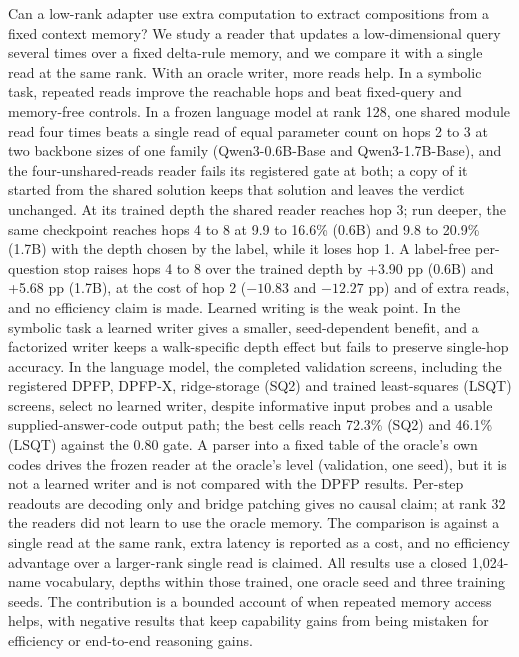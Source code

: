 Can a low-rank adapter use extra computation to extract compositions from a fixed context memory?
We study a reader that updates a low-dimensional query several times over a fixed delta-rule memory, and we compare it with a single read at the same rank.
With an oracle writer, more reads help.
In a symbolic task, repeated reads improve the reachable hops and beat fixed-query and memory-free controls.  %
In a frozen language model at rank 128, one shared module read four times beats a single read of equal parameter count on hops 2 to 3 at two backbone sizes of one family (Qwen3-0.6B-Base and Qwen3-1.7B-Base), and the four-unshared-reads reader fails its registered gate at both; a copy of it started from the shared solution keeps that solution and leaves the verdict unchanged.  %
At its trained depth the shared reader reaches hop 3; run deeper, the same checkpoint reaches hops 4 to 8 at 9.9 to 16.6\% (0.6B) and 9.8 to 20.9\% (1.7B) with the depth chosen by the label, while it loses hop 1.  %
A label-free per-question stop raises hops 4 to 8 over the trained depth by +3.90 pp (0.6B) and +5.68 pp (1.7B), at the cost of hop 2 ($-10.83$ and $-12.27$ pp) and of extra reads, and no efficiency claim is made.  %
Learned writing is the weak point.
In the symbolic task a learned writer gives a smaller, seed-dependent benefit, and a factorized writer keeps a walk-specific depth effect but fails to preserve single-hop accuracy.  %
In the language model, the completed validation screens, including the registered DPFP, DPFP-X, ridge-storage (SQ2) and trained least-squares (LSQT) screens, select no learned writer, despite informative input probes and a usable supplied-answer-code output path; the best cells reach 72.3\% (SQ2) and 46.1\% (LSQT) against the 0.80 gate.  %
A parser into a fixed table of the oracle's own codes drives the frozen reader at the oracle's level (validation, one seed), but it is not a learned writer and is not compared with the DPFP results.  %
Per-step readouts are decoding only and bridge patching gives no causal claim; at rank 32 the readers did not learn to use the oracle memory.  %
The comparison is against a single read at the same rank, extra latency is reported as a cost, and no efficiency advantage over a larger-rank single read is claimed.  %
All results use a closed 1,024-name vocabulary, depths within those trained, one oracle seed and three training seeds.
The contribution is a bounded account of when repeated memory access helps, with negative results that keep capability gains from being mistaken for efficiency or end-to-end reasoning gains.  %
